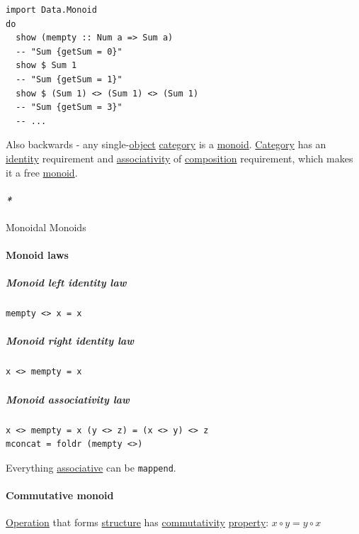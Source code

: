 \documentclass[a4paper,14pt,oneside]{book}
\begin{document}
\begin{verbatim}
import Data.Monoid
do
  show (mempty :: Num a => Sum a)
  -- "Sum {getSum = 0}"
  show $ Sum 1
  -- "Sum {getSum = 1}"
  show $ (Sum 1) <> (Sum 1) <> (Sum 1)
  -- "Sum {getSum = 3}"
  -- ...
\end{verbatim}

Also backwards - any single-\hyperref[orged022cb]{object} \hyperref[orge2e250a]{category} is a \hyperref[orgb10cc2a]{monoid}. \hyperref[orge2e250a]{Category} has an \hyperref[orgc014b57]{identity} requirement and \hyperref[orgb754e7c]{associativity} of \hyperref[org1b47f42]{composition} requirement, which makes it a free \hyperref[orgb10cc2a]{monoid}. 

\paragraph{\emph{*}}
\label{sec:org0e5fc2f}

\label{org6910901}Monoidal
\label{org73bf260}Monoids

\paragraph{\label{orgbe87c1e}Monoid laws}
\label{sec:orgd3ba2e3}
\subparagraph{\label{org2bf3dc0}Monoid left identity law}
\label{sec:org3e3fae7}
\begin{verbatim}
mempty <> x = x
\end{verbatim}

\subparagraph{\label{org6872714}Monoid right identity law}
\label{sec:orgb928af0}
\begin{verbatim}
x <> mempty = x
\end{verbatim}

\subparagraph{\label{orgb4a38d9}Monoid associativity law}
\label{sec:org1fd54c9}
\begin{verbatim}
x <> mempty = x (y <> z) = (x <> y) <> z
mconcat = foldr (mempty <>)
\end{verbatim}

Everything \hyperref[orga66f8ae]{associative} can be \texttt{mappend}.

\paragraph{\label{orgf57a536}Commutative monoid}
\label{sec:org540d6d4}
\hyperref[orgf147542]{Operation} that forms \hyperref[org2f3ef45]{structure} has \hyperref[org0e84ed4]{commutativity} \hyperref[orgbb6ea59]{property}:
\(x \circ y = y \circ x\)
\end{document}

